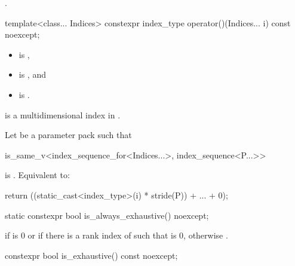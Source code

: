 \begin{itemdescr}
\pnum
\returns
{}.
\end{itemdescr}

%
\begin{itemdecl}
template<class... Indices>
  constexpr index_type operator()(Indices... i) const noexcept;
\end{itemdecl}

\begin{itemdescr}
\pnum
\constraints
\begin{itemize}
\item
{} is ,
\item
{} is , and
\item
{} is .
\end{itemize}

\pnum
\expects
{} is
a multidimensional index in .

\pnum
\effects
Let  be a parameter pack such that
\begin{codeblock}
is_same_v<index_sequence_for<Indices...>, index_sequence<P...>>
\end{codeblock}
is .
Equivalent to:
\begin{codeblock}
return ((static_cast<index_type>(i) * stride(P)) + ... + 0);
\end{codeblock}
\end{itemdescr}

%
\begin{itemdecl}
static constexpr bool is_always_exhaustive() noexcept;
\end{itemdecl}

\begin{itemdescr}
\pnum
\returns
{} if  is 0
or if there is a rank index  of 
such that  is 0,
otherwise .
\end{itemdescr}

%
\begin{itemdecl}
constexpr bool is_exhaustive() const noexcept;
\end{itemdecl}

